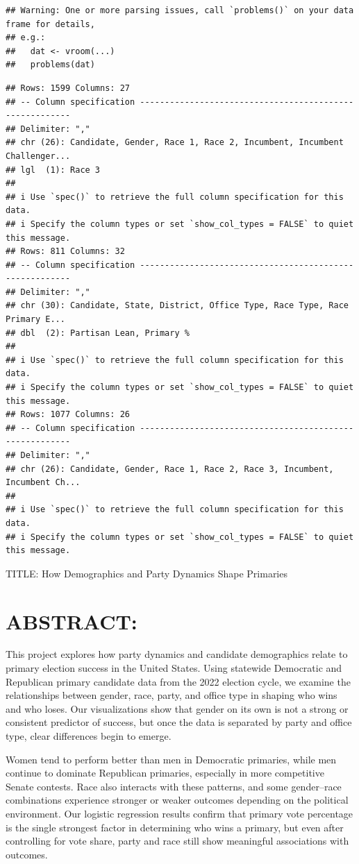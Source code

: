 \documentclass[
]{article}
\begin{document}
\begin{verbatim}
## Warning: One or more parsing issues, call `problems()` on your data frame for details,
## e.g.:
##   dat <- vroom(...)
##   problems(dat)
\end{verbatim}

\begin{verbatim}
## Rows: 1599 Columns: 27
## -- Column specification --------------------------------------------------------
## Delimiter: ","
## chr (26): Candidate, Gender, Race 1, Race 2, Incumbent, Incumbent Challenger...
## lgl  (1): Race 3
## 
## i Use `spec()` to retrieve the full column specification for this data.
## i Specify the column types or set `show_col_types = FALSE` to quiet this message.
## Rows: 811 Columns: 32
## -- Column specification --------------------------------------------------------
## Delimiter: ","
## chr (30): Candidate, State, District, Office Type, Race Type, Race Primary E...
## dbl  (2): Partisan Lean, Primary %
## 
## i Use `spec()` to retrieve the full column specification for this data.
## i Specify the column types or set `show_col_types = FALSE` to quiet this message.
## Rows: 1077 Columns: 26
## -- Column specification --------------------------------------------------------
## Delimiter: ","
## chr (26): Candidate, Gender, Race 1, Race 2, Race 3, Incumbent, Incumbent Ch...
## 
## i Use `spec()` to retrieve the full column specification for this data.
## i Specify the column types or set `show_col_types = FALSE` to quiet this message.
\end{verbatim}

TITLE: How Demographics and Party Dynamics Shape Primaries

\section{ABSTRACT:}\label{abstract}

This project explores how party dynamics and candidate demographics
relate to primary election success in the United States. Using statewide
Democratic and Republican primary candidate data from the 2022 election
cycle, we examine the relationships between gender, race, party, and
office type in shaping who wins and who loses. Our visualizations show
that gender on its own is not a strong or consistent predictor of
success, but once the data is separated by party and office type, clear
differences begin to emerge.

Women tend to perform better than men in Democratic primaries, while men
continue to dominate Republican primaries, especially in more
competitive Senate contests. Race also interacts with these patterns,
and some gender--race combinations experience stronger or weaker
outcomes depending on the political environment. Our logistic regression
results confirm that primary vote percentage is the single strongest
factor in determining who wins a primary, but even after controlling for
vote share, party and race still show meaningful associations with
outcomes.
\end{document}
